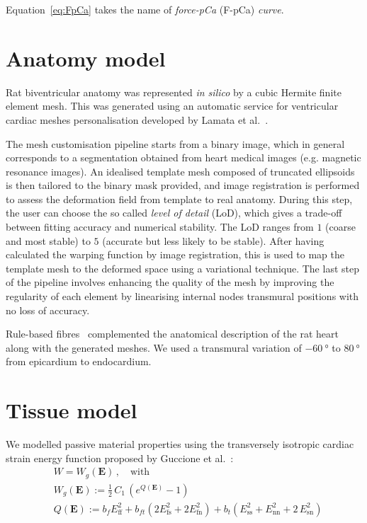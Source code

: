 \noindent
Equation~\eqref{eq:FpCa} takes the name of \textit{force-pCa} (\acs{F-pCa}) \textit{curve}.


%
%
%
\section{Anatomy model}\label{sec:ch2anatomy}
Rat biventricular anatomy was represented \textit{in silico} by a cubic Hermite finite element mesh. This was generated using an automatic service for ventricular cardiac meshes personalisation developed by Lamata et al.~\cite{Lamata:2011, Lamata:2014}.

\vspace{0.2cm}
The mesh customisation pipeline starts from a binary image, which in general corresponds to a segmentation obtained from heart medical images (e.g. magnetic resonance images). An idealised template mesh composed of truncated ellipsoids is then tailored to the binary mask provided, and image registration is performed to assess the deformation field from template to real anatomy. During this step, the user can choose the so called \textit{level of detail} (\acs{LoD}), which gives a trade-off between fitting accuracy and numerical stability. The LoD ranges from $1$ (coarse and most stable) to $5$ (accurate but less likely to be stable). After having calculated the warping function by image registration, this is used to map the template mesh to the deformed space using a variational technique. The last step of the pipeline involves enhancing the quality of the mesh by improving the regularity of each element by linearising internal nodes transmural positions with no loss of accuracy.

\vspace{0.2cm}
Rule-based fibres~\cite{Bayer:2012} complemented the anatomical description of the rat heart along with the generated meshes. We used a transmural variation of $\SI{-60}{\degree}$ to $\SI{80}{\degree}$ from epicardium to endocardium.


%
%
%
\section{Tissue model}\label{sec:ch2tissuemodel}
We modelled passive material properties using the transversely isotropic cardiac strain energy function proposed by Guccione et al.~\cite{Guccione:1991}:
%
\begin{align}\label{eq:guccstrainenergy}
    &W = W_g(\mathbf{E})\,,\quad\text{with} \\
    &W_g(\mathbf{E}) := \frac{1}{2}\,C_1\,(e^{Q(\mathbf{E})}-1) \\
    &Q(\mathbf{E}) := b_f E_{\text{ff}}^2 + b_{ft}(2E_{\text{fs}}^2+2E_{\text{fn}}^2) + b_t(E_{\text{ss}}^2+E_{\text{nn}}^2+2\,E_{\text{sn}}^2)
\end{align}

